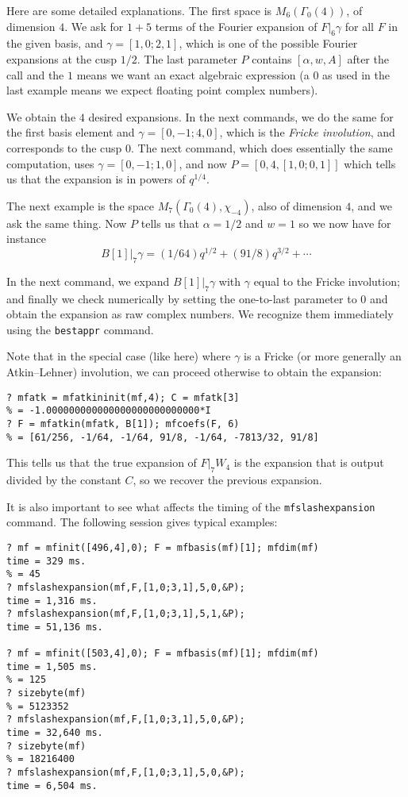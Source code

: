 \documentclass[11pt]{article}
\newcommand{\al}{\alpha}
\newcommand{\ga}{\gamma}
\newcommand{\G}{\Gamma}
\def\kbd#1{{\tt #1}}
\begin{document}
Here are some detailed explanations. The first space is $M_6(\G_0(4))$,
of dimension $4$. We ask for $1+5$ terms of the Fourier expansion of
$F|_6\ga$ for all $F$ in the given basis, and $\ga=[1,0;2,1]$, which is one
of the possible Fourier expansions at the cusp $1/2$. The last parameter
$P$ contains $[\al,w,A]$ after the call and the $1$ means we want an exact
algebraic expression (a $0$ as used in the last example means we expect
floating point complex numbers).

We obtain the $4$ desired expansions. In the next commands, we do the same
for the first basis element and $\ga=[0,-1;4,0]$, which is the
\emph{Fricke involution}, and corresponds to the cusp $0$. The next
command, which does essentially the same computation, uses $\ga=[0,-1;1,0]$,
and now $P=[0,4, [1,0;0,1]]$ which tells us that the expansion is in powers of
$q^{1/4}$.

The next example is the space $M_7(\G_0(4),\chi_{-4})$, also of
dimension $4$, and we ask the same thing. Now $P$ tells us that $\al = 1/2$
and $w = 1$ so we now have for instance
$$B[1]|_7\ga = (1/64)q^{1/2} + (91/8)q^{3/2}+\cdots$$

In the next command, we expand $B[1]|_7\ga$ with $\ga$ equal to the Fricke
involution; and finally we check numerically by setting the one-to-last
parameter to $0$ and obtain the expansion as raw complex numbers. We
recognize them immediately using the \kbd{bestappr} command.

Note that in the special case (like here) where $\ga$ is a Fricke (or more
generally an Atkin--Lehner) involution, we can proceed otherwise to obtain
the expansion:

\begin{verbatim}
? mfatk = mfatkininit(mf,4); C = mfatk[3]
% = -1.000000000000000000000000000*I
? F = mfatkin(mfatk, B[1]); mfcoefs(F, 6)
% = [61/256, -1/64, -1/64, 91/8, -1/64, -7813/32, 91/8]
\end{verbatim}

This tells us that the true expansion of $F|_7W_4$ is the expansion that
is output divided by the constant $C$, so we recover the previous
expansion.

\smallskip

It is also important to see what affects the timing of the
\kbd{mfslashexpansion} command. The following session gives typical examples:

\begin{verbatim}
? mf = mfinit([496,4],0); F = mfbasis(mf)[1]; mfdim(mf)
time = 329 ms.
% = 45
? mfslashexpansion(mf,F,[1,0;3,1],5,0,&P);
time = 1,316 ms.
? mfslashexpansion(mf,F,[1,0;3,1],5,1,&P);
time = 51,136 ms.

? mf = mfinit([503,4],0); F = mfbasis(mf)[1]; mfdim(mf)
time = 1,505 ms.
% = 125
? sizebyte(mf)
% = 5123352
? mfslashexpansion(mf,F,[1,0;3,1],5,0,&P);
time = 32,640 ms.
? sizebyte(mf)
% = 18216400
? mfslashexpansion(mf,F,[1,0;3,1],5,0,&P);
time = 6,504 ms.
\end{verbatim}
\end{document}
